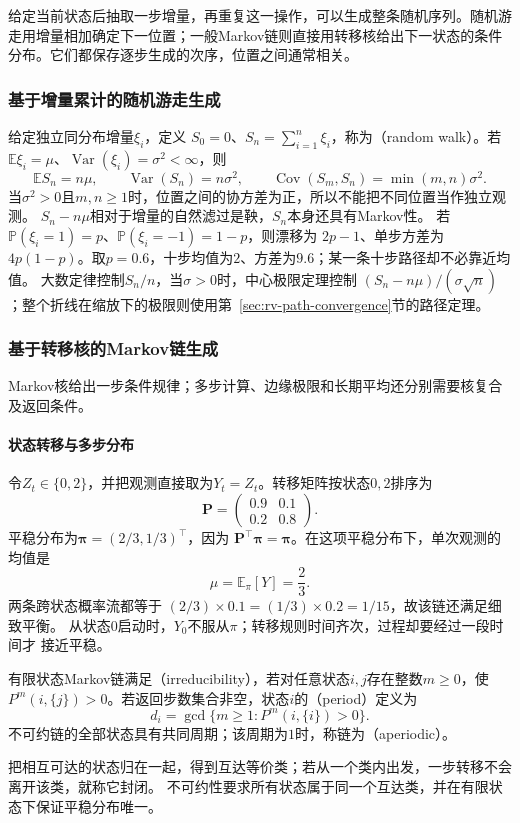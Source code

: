 给定当前状态后抽取一步增量，再重复这一操作，可以生成整条随机序列。随机游走用增量相加确定下一位置；一般Markov链则直接用转移核给出下一状态的条件分布。它们都保存逐步生成的次序，位置之间通常相关。
\label{sec:rv-state-generation}


\subsubsection{基于增量累计的随机游走生成}
\label{sec:rv-random-walk}
给定独立同分布增量\(\xi_i\)，定义
\(S_0=0\)、\(S_n=\sum_{i=1}^n\xi_i\)，称为（random walk）。若
\(\mathbb E\xi_i=\mu\)、\(\operatorname{Var}(\xi_i)=\sigma^2<\infty\)，则
\[
\mathbb ES_n=n\mu,\qquad
\operatorname{Var}(S_n)=n\sigma^2,\qquad
\operatorname{Cov}(S_m,S_n)=\min(m,n)\sigma^2.
\]
当\(\sigma^2>0\)且\(m,n\geq1\)时，位置之间的协方差为正，所以不能把不同位置当作独立观测。
\(S_n-n\mu\)相对于增量的自然滤过是鞅，\(S_n\)本身还具有Markov性。
若\(\mathbb P(\xi_i=1)=p\)、\(\mathbb P(\xi_i=-1)=1-p\)，则漂移为
\(2p-1\)、单步方差为\(4p(1-p)\)。取\(p=0.6\)，十步均值为\(2\)、方差为\(9.6\)；某一条十步路径却不必靠近均值。
大数定律控制\(S_n/n\)，当\(\sigma>0\)时，中心极限定理控制
\((S_n-n\mu)/(\sigma\sqrt n)\)；整个折线在缩放下的极限则使用第~\ref{sec:rv-path-convergence}节的路径定理。

\subsubsection{基于转移核的Markov链生成}
Markov核给出一步条件规律；多步计算、边缘极限和长期平均还分别需要核复合及返回条件。

\paragraph{状态转移与多步分布}
\begin{example}[相关的两状态观测]
  \label{ex:stoch-two-state-chain}
  令$Z_t\in\{0,2\}$，并把观测直接取为$Y_t=Z_t$。转移矩阵按状态$0,2$排序为
  \[
    \bm{P}
    =
    \begin{pmatrix}
      0.9 & 0.1\\
      0.2 & 0.8
    \end{pmatrix}.
  \]
  平稳分布为$\bm{\pi}=(2/3,1/3)^\top$，因为
  $\bm{P}^{\top}\bm{\pi}=\bm{\pi}$。在这项平稳分布下，单次观测的均值是
  \[
    \mu=\mathbb{E}_{\pi}[Y]=\frac23.
  \]
  两条跨状态概率流都等于
  $(2/3)\times0.1=(1/3)\times0.2=1/15$，故该链还满足细致平衡。
  从状态$0$启动时，$Y_0$不服从$\pi$；转移规则时间齐次，过程却要经过一段时间才
  接近平稳。
\end{example}
\begin{definition}[有限链的不可约性与周期]
  \label{def:stoch-finite-irreducibility-period}
  有限状态Markov链满足（irreducibility），若对任意状态\(i,j\)存在整数\(m\geq0\)，使\(P^m(i,\{j\})>0\)。若返回步数集合非空，状态\(i\)的（period）定义为
  \[ d_i=\gcd\{m\geq1:P^m(i,\{i\})>0\}. \]
  不可约链的全部状态具有共同周期；该周期为\(1\)时，称链为（aperiodic）。
\end{definition}
把相互可达的状态归在一起，得到互达等价类；若从一个类内出发，一步转移不会离开该类，就称它封闭。
不可约性要求所有状态属于同一个互达类，并在有限状态下保证平稳分布唯一。

